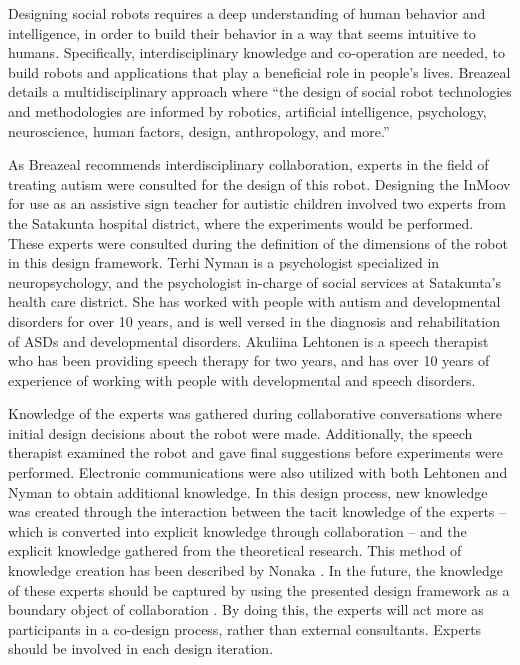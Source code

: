 \begin{figure}
  \label{fig:designIterations}
\end{figure}


Designing social robots requires a deep understanding of human behavior and intelligence, in order to build their behavior in a way that seems intuitive to humans. Specifically, interdisciplinary knowledge and co-operation are needed, to build robots and applications that play a beneficial role in people's lives. Breazeal details a multidisciplinary approach where ``the design of social robot technologies and methodologies are informed by robotics, artificial intelligence, psychology, neuroscience, human factors, design, anthropology, and more.'' \cite{Breazeal2008}

As Breazeal recommends interdisciplinary collaboration, experts in the field of treating autism were consulted for the design of this robot. Designing the InMoov for use as an assistive sign teacher for autistic children involved two experts from the Satakunta hospital district, where the experiments would be performed. These experts were consulted during the definition of the dimensions of the robot in this design framework. Terhi Nyman is a psychologist specialized in neuropsychology, and the psychologist in-charge of social services at Satakunta's health care district. She has worked with people with autism and developmental disorders for over 10 years, and is well versed in the diagnosis and rehabilitation of ASDs and developmental disorders. Akuliina Lehtonen is a speech therapist who has been providing speech therapy for two years, and has over 10 years of experience of working with people with developmental and speech disorders. 

Knowledge of the experts was gathered during collaborative conversations where initial design decisions about the robot were made. Additionally, the speech therapist examined the robot and gave final suggestions before experiments were performed. Electronic communications were also utilized with both Lehtonen and Nyman to obtain additional knowledge. In this design process, new knowledge was created through the interaction between the tacit knowledge of the experts – which is converted into explicit knowledge through collaboration – and the explicit knowledge gathered from the theoretical research. This method of knowledge creation has been  described by Nonaka \cite{nonaka1995knowledge}. In the future, the knowledge of these experts should be captured by using the presented design framework as a boundary object of collaboration \cite{nicolini2012understanding}. By doing this, the experts will act more as participants in a co-design process, rather than external consultants. Experts should be involved in each design iteration. 


